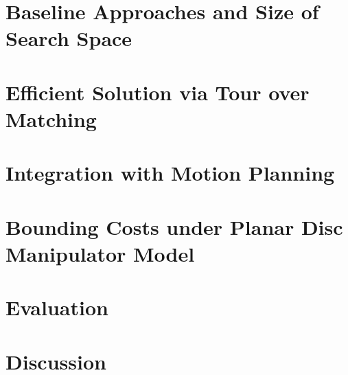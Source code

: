 \documentclass[journal]{IEEEtran}
\begin{document}
\section{Baseline Approaches and Size of Search Space}
\label{sec:baseline}


\section{Efficient Solution via Tour over Matching}
\label{sec:approximation}


\section{Integration with Motion Planning}
\label{sec:integration}


\section{Bounding Costs under Planar Disc Manipulator Model}
\label{sec:cost_bounds}


\section{Evaluation}
\label{sec:evaluation}


\section{Discussion}
\label{sec:discussion}


%
%

%
% 






\end{document}
